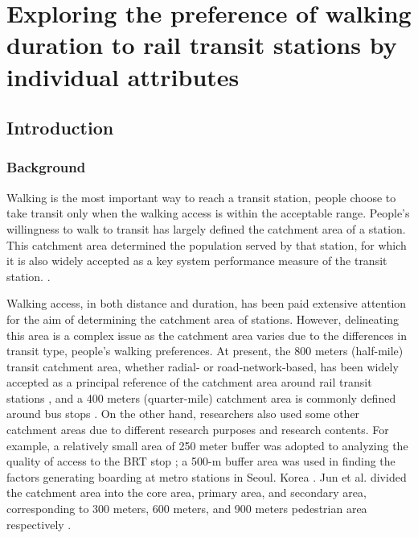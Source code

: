 \chapter{Exploring the preference of walking duration to rail transit stations by individual attributes}

\section{Introduction}



\subsection{Background}
Walking is the most important way to reach a transit station, people choose to take transit only when the walking access is within the acceptable range. People’s willingness to walk to transit has largely defined the catchment area of a station. This catchment area determined the population served by that station, for which it is also widely accepted as a key system performance measure of the transit station. \cite{fielding1978performance,el2014new,chia2016walking}. 

Walking access, in both distance and duration, has been paid extensive attention for the aim of determining the catchment area of stations. However, delineating this area is a complex issue as the catchment area varies due to the differences in transit type, people's walking preferences. At present, the 800 meters (half-mile) transit catchment area, whether radial- or road-network-based, has been widely accepted as a principal reference of the catchment area around rail transit stations \cite{kuby2004factors,gutierrez2011transit,cardozo2012application,zhao2013influences}, and a 400 meters (quarter-mile) catchment area is commonly defined around bus stops \cite{o1992analysis,zhao2003forecasting}. On the other hand, researchers also used some other catchment areas due to different research purposes and research contents. For example, a relatively small area of 250 meter buffer was adopted to analyzing the quality of access to the BRT stop
\cite{estupinan2008relationship}; a 500-m buffer area was used in finding the factors generating boarding at metro stations in Seoul. Korea \cite{sohn2010factors}. Jun et al. divided the catchment area into the core area, primary area, and secondary area, corresponding to 300 meters, 600 meters, and 900 meters pedestrian area respectively \cite{jun2015land}.

